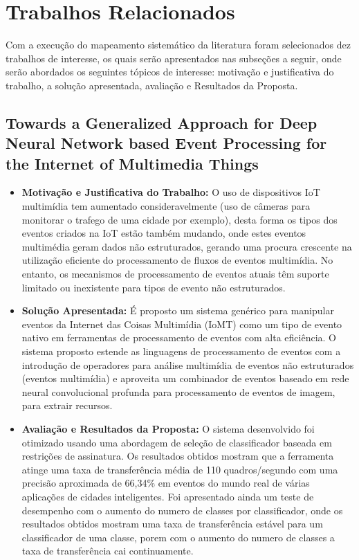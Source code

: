 \documentclass[tid,table]{texufpel} %
\begin{document}
\section{Trabalhos Relacionados}
Com a execução do mapeamento sistemático da literatura
foram selecionados dez trabalhos de interesse, os quais serão apresentados nas subseções a seguir, onde serão abordados os seguintes tópicos de interesse: motivação e justificativa do trabalho, a solução apresentada, avaliação e Resultados da Proposta.


\subsection{Towards a Generalized Approach for Deep Neural Network based Event Processing for the Internet of Multimedia Things}


\begin{itemize}
	\item \textbf{Motivação e Justificativa do Trabalho:} O uso de dispositivos IoT multimídia tem aumentado consideravelmente (uso de câmeras para monitorar o trafego de uma cidade por exemplo), desta forma os tipos dos eventos criados na IoT estão também mudando, onde estes eventos multimédia geram dados não estruturados, gerando uma procura crescente na utilização eficiente do processamento de fluxos de eventos multimídia. No entanto, os mecanismos de processamento de eventos atuais têm suporte limitado ou inexistente para tipos de evento não estruturados.
	
	\item \textbf{Solução Apresentada:} É proposto um sistema genérico para manipular eventos da Internet das Coisas Multimídia (IoMT) como um tipo de evento nativo em ferramentas de processamento de eventos com alta eficiência. O sistema proposto estende as linguagens de processamento de eventos com a introdução de operadores para análise multimídia de eventos não estruturados (eventos multimídia) e aproveita um combinador de eventos baseado em rede neural convolucional profunda para processamento de eventos de imagem, para extrair recursos.
	
	\item \textbf{Avaliação e Resultados da Proposta:} O sistema desenvolvido foi otimizado usando uma abordagem de seleção de classificador baseada em restrições de assinatura. Os resultados obtidos mostram que a ferramenta atinge uma taxa de transferência média de 110 quadros/segundo com uma precisão aproximada de 66,34\% em eventos do mundo real de várias aplicações de cidades inteligentes. Foi apresentado ainda um teste de desempenho com o aumento do numero de classes por classificador, onde os resultados obtidos mostram uma taxa de transferência estável para um classificador de uma classe, porem com o aumento do numero de classes a taxa de transferência cai continuamente.  
	
\end{itemize}
\end{document}
